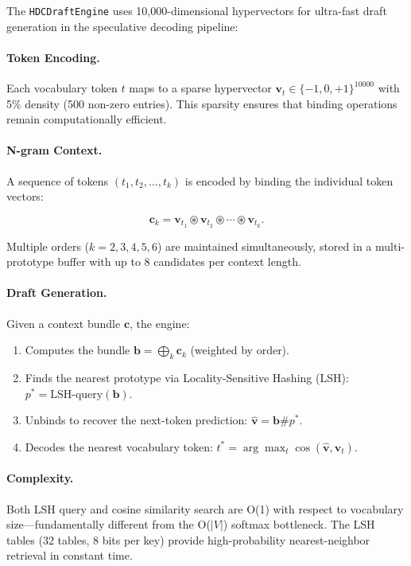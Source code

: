 \documentclass[11pt,a4paper,openright]{book}
\begin{document}
The \texttt{HDCDraftEngine} uses 10,000-dimensional hypervectors for ultra-fast draft generation in the speculative decoding pipeline:

\paragraph{Token Encoding.}
Each vocabulary token $t$ maps to a sparse hypervector $\mathbf{v}_t \in \{-1, 0, +1\}^{10000}$ with 5\% density (500 non-zero entries). This sparsity ensures that binding operations remain computationally efficient.

\paragraph{N-gram Context.}
A sequence of tokens $(t_1, t_2, \ldots, t_k)$ is encoded by binding the individual token vectors:

\begin{equation}
	\label{eq:ngram_hd}
	\mathbf{c}_k = \mathbf{v}_{t_1} \circledast \mathbf{v}_{t_2} \circledast \cdots \circledast \mathbf{v}_{t_k}.
\end{equation}

Multiple orders ($k=2,3,4,5,6$) are maintained simultaneously, stored in a multi-prototype buffer with up to 8 candidates per context length.

\paragraph{Draft Generation.}
Given a context bundle $\mathbf{c}$, the engine:
\begin{enumerate}
	\item Computes the bundle $\mathbf{b} = \bigoplus_{k} \mathbf{c}_k$ (weighted by order).
	\item Finds the nearest prototype via Locality-Sensitive Hashing (LSH): $p^* = \text{LSH-query}(\mathbf{b})$.
	\item Unbinds to recover the next-token prediction: $\hat{\mathbf{v}} = \mathbf{b} \# p^*$.
	\item Decodes the nearest vocabulary token: $t^* = \arg\max_t \cos(\hat{\mathbf{v}}, \mathbf{v}_t)$.
\end{enumerate}

\paragraph{Complexity.}
Both LSH query and cosine similarity search are O(1) with respect to vocabulary size---fundamentally different from the O($|V|$) softmax bottleneck. The LSH tables (32 tables, 8 bits per key) provide high-probability nearest-neighbor retrieval in constant time.
\end{document}
